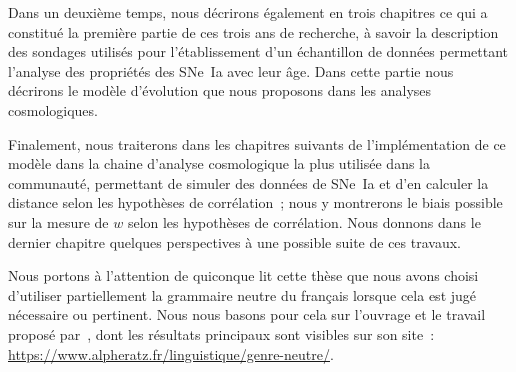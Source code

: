 \documentclass[../main/main.tex]{subfiles}
\begin{document}
Dans un deuxième temps, nous décrirons également en trois chapitres ce qui a
constitué la première partie de ces trois ans de recherche, à savoir la
description des sondages utilisés pour l'établissement d'un échantillon de
données permettant l'analyse des propriétés des SNe~Ia avec leur âge. Dans cette
partie nous décrirons le modèle d'évolution que nous proposons dans les analyses
cosmologiques.

Finalement, nous traiterons dans les chapitres suivants de l'implémentation de
ce modèle dans la chaine d'analyse cosmologique la plus utilisée dans la
communauté, permettant de simuler des données de SNe~Ia et d'en calculer la
distance selon les hypothèses de corrélation~; nous y montrerons le biais
possible sur la mesure de $w$ selon les hypothèses de corrélation. Nous donnons
dans le dernier chapitre quelques perspectives à une possible suite de ces
travaux.

\vfill

Nous portons à l'attention de quiconque lit cette thèse que nous avons choisi
d'utiliser partiellement la grammaire neutre du français lorsque cela est jugé
nécessaire ou pertinent. Nous nous basons pour cela sur l'ouvrage et le travail
proposé par~\cite{alpheratz2018}, dont les résultats principaux sont visibles
sur son site~: \href{https://www.alpheratz.fr/linguistique/genre-neutre/}
{https://www.alpheratz.fr/linguistique/genre-neutre/}.

\vfill

% 
% 
\end{document}
